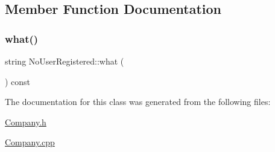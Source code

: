 \subsection{Member Function Documentation}
\mbox{\label{class_no_user_registered_a07aae9e65baf017e03fbe3445ff5ec37}} 
\subsubsection{\texorpdfstring{what()}{what()}}
{\footnotesize\ttfamily string No\+User\+Registered\+::what (\begin{DoxyParamCaption}{ }\end{DoxyParamCaption}) const}



The documentation for this class was generated from the following files\+:\begin{DoxyCompactItemize}
\item 
\mbox{\hyperlink{_company_8h}{Company.\+h}}\item 
\mbox{\hyperlink{_company_8cpp}{Company.\+cpp}}\end{DoxyCompactItemize}
